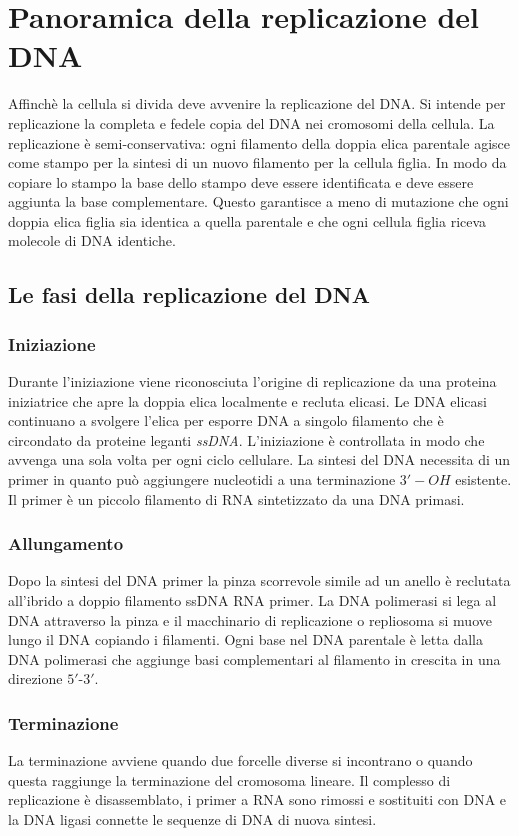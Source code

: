 \section{Panoramica della replicazione del DNA}
Affinch\`e la cellula si divida deve avvenire la replicazione del DNA. Si intende per replicazione la completa e fedele copia del DNA nei cromosomi della cellula. La replicazione \`e
semi-conservativa: ogni filamento della doppia elica parentale agisce come stampo per la sintesi di un nuovo filamento per la cellula figlia. In modo da copiare lo stampo la base dello
stampo deve essere identificata e deve essere aggiunta la base complementare. Questo garantisce a meno di mutazione che ogni doppia elica figlia sia identica a quella parentale e che
ogni cellula figlia riceva molecole di DNA identiche. 
\subsection{Le fasi della replicazione del DNA}
\subsubsection{Iniziazione}
Durante l'iniziazione viene riconosciuta l'origine di replicazione da una proteina iniziatrice che apre la doppia elica localmente e recluta elicasi. Le DNA elicasi continuano a 
svolgere l'elica per esporre DNA a singolo filamento che \`e circondato da proteine leganti \emph{ssDNA}. L'iniziazione \`e controllata in modo che avvenga una sola volta per ogni 
ciclo cellulare. La sintesi del DNA necessita di un primer in quanto pu\`o aggiungere nucleotidi a una terminazione $3'-OH$ esistente. Il primer \`e un piccolo filamento di RNA 
sintetizzato da una DNA primasi. 
\subsubsection{Allungamento}
Dopo la sintesi del DNA primer la pinza scorrevole simile ad un anello \`e reclutata all'ibrido a doppio filamento ssDNA RNA primer. La DNA polimerasi si lega al DNA attraverso la 
pinza e il macchinario di replicazione o repliosoma si muove lungo il DNA copiando i filamenti. Ogni base nel DNA parentale \`e letta dalla DNA polimerasi che aggiunge basi complementari
al filamento in crescita in una direzione $5'$-$3'$. 
\subsubsection{Terminazione}
La terminazione avviene quando due forcelle diverse si incontrano o quando questa raggiunge la terminazione del cromosoma lineare. Il complesso di replicazione \`e disassemblato, i 
primer a RNA sono rimossi e sostituiti con DNA e la DNA ligasi connette le sequenze di DNA di nuova sintesi. 
